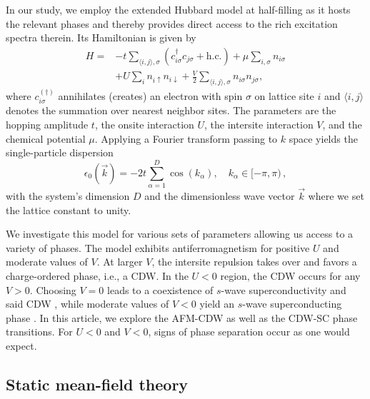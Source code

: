 \documentclass[
    reprint, 
    aps,
    preprintnumbers,
    twocolumn,
    prb,
    superscriptaddress
]{revtex4-2}
\newcommand{\vk}{\vec{k}}
\begin{document}
In our study, we employ the extended Hubbard model at half-filling as it hosts
the relevant phases and thereby provides direct access to the rich excitation spectra therein.
Its Hamiltonian is given by
\begin{align}
\nonumber
        H = &-t \sum_{\langle i, j \rangle, \sigma} \left( c_{i\sigma}^\dagger c_{j\sigma} + \text{h.c.} \right) 
        + \mu \sum_{i,\sigma} n_{i\sigma} \\
        & + U \sum_{i} n_{i\uparrow} n_{i\downarrow} 
        + \frac{V}{2} \sum_{\langle i, j\rangle, \sigma} n_{i\sigma} n_{j\sigma},
				    \label{eqn:full_hamiltonian}
\end{align}
where $c_{i\sigma}^{(\dagger)}$ annihilates (creates) an electron with spin $\sigma$ on lattice site $i$ 
and $\langle i, j\rangle$ denotes the summation over nearest neighbor sites.
The parameters are the hopping amplitude $t$, the onsite interaction $U$, the intersite interaction $V$, and the chemical potential $\mu$.
Applying a Fourier transform passing to $k$ space yields the single-particle dispersion 
\begin{equation}
    \epsilon_0 (\vk) = -2t \sum_{\alpha=1}^D \cos(k_\alpha), \quad k_\alpha \in [-\pi, \pi)\,,
\end{equation}
with the system's dimension $D$ and the dimensionless wave vector $\vk$ where we set the lattice constant to unity.

We investigate this model for various sets of parameters allowing us access to a variety of phases.
The model exhibits antiferromagnetism for positive $U$ and moderate values of $V$.
At larger $V$, the intersite repulsion takes over and favors a charge-ordered phase, i.e., a CDW.
In the $U<0$ region, the CDW occurs for any $V>0$.
Choosing $V=0$ leads to a coexistence of $s$-wave superconductivity and said CDW \cite{yang90}, while moderate
values of  $V<0$ yield an $s$-wave superconducting phase \cite{Micnas88b}.
In this article, we explore the AFM-CDW as well as the CDW-SC phase transitions.
For $U<0$ and $V<0$, signs of phase separation occur as one would expect.


\subsection{Static mean-field theory}
\end{document}
